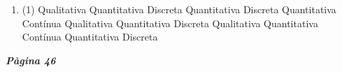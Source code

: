 \documentclass[a4paper, pdf, twoside]{book}
\begin{document}
\begin{multicols}{2}
\begin{enumerate}

 \item[\fontfamily{phv}\selectfont\color{blue}\textbf{2}. ] 
 \begin{tasks}[column-sep=1em, item-indent=1.3333em](1)
	 \task Qualitativa
	 \task Quantitativa Discreta
	 \task Quantitativa Discreta
	 \task Quantitativa Contínua
	 \task Qualitativa
	 \task Quantitativa Discreta
	 \task Qualitativa
	 \task Quantitativa Contínua
	 \task Quantitativa Discreta
\end{tasks}
 \end{enumerate}
\vspace{0.3cm}


{\textbf{\em Pàgina 46}} \hrulefill
\begin{enumerate}
\vspace{0.25cm}




\end{enumerate}
\end{multicols}
\end{document}
